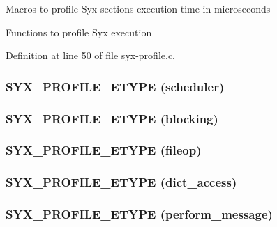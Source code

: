 Macros to profile Syx sections execution time in microseconds

Functions to profile Syx execution 

Definition at line 50 of file syx-profile.c.\hypertarget{syx-profile_8h_7181a4a8be876589ccf60b56f7ee792a}{
\subsubsection{\setlength{\rightskip}{0pt plus 5cm}SYX\_\-PROFILE\_\-ETYPE (scheduler)}}
\label{syx-profile_8h_7181a4a8be876589ccf60b56f7ee792a}


\hypertarget{syx-profile_8h_96434be4e8746f3826e1d55bb9a1842f}{
\subsubsection{\setlength{\rightskip}{0pt plus 5cm}SYX\_\-PROFILE\_\-ETYPE (blocking)}}
\label{syx-profile_8h_96434be4e8746f3826e1d55bb9a1842f}


\hypertarget{syx-profile_8h_c49b8442f54716f64e5371d82e5430a2}{
\subsubsection{\setlength{\rightskip}{0pt plus 5cm}SYX\_\-PROFILE\_\-ETYPE (fileop)}}
\label{syx-profile_8h_c49b8442f54716f64e5371d82e5430a2}


\hypertarget{syx-profile_8h_f8c3f5c3c9a5d981d510a828f29995c7}{
\subsubsection{\setlength{\rightskip}{0pt plus 5cm}SYX\_\-PROFILE\_\-ETYPE (dict\_\-access)}}
\label{syx-profile_8h_f8c3f5c3c9a5d981d510a828f29995c7}


\hypertarget{syx-profile_8h_ae1f40f75f9c87d40e1f64ff395febb0}{
\subsubsection{\setlength{\rightskip}{0pt plus 5cm}SYX\_\-PROFILE\_\-ETYPE (perform\_\-message)}}
\label{syx-profile_8h_ae1f40f75f9c87d40e1f64ff395febb0}


